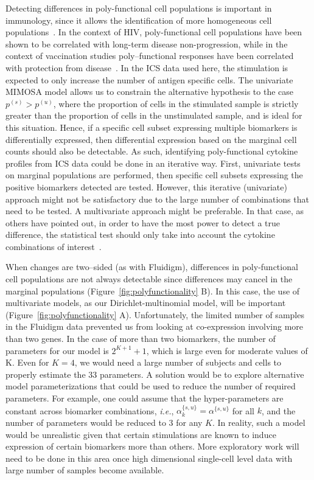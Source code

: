 \documentclass[12pt,oupdraft]{biostatistics}
\begin{document}
Detecting differences in poly-functional cell populations is important in immunology, since it allows the identification of more homogeneous cell populations~\citep{Milush:2009bz}.
In the context of HIV, poly-functional cell populations have been shown to be correlated with long-term disease non-progression, while in the context of vaccination studies poly--functional responses have been correlated with protection from disease~\citep{Betts:2006dw,Darrah:2007ih,Precopio:2007ht}.
In the ICS data used here, the stimulation is expected to only increase the number of antigen specific cells. The univariate MIMOSA model allows us to constrain the alternative hypothesis to the case $p^{(s)} > p^{(u)}$, where the proportion of cells in the stimulated sample is strictly greater than the proportion of cells in the unstimulated sample, and is ideal for this situation.
Hence, if a specific cell subset expressing multiple biomarkers is differentially expressed, then differential expression based on the marginal cell counts should also be detectable.
As such, identifying poly-functional cytokine profiles from ICS data could be done in an iterative way.
First, univariate tests on marginal populations are performed, then specific cell subsets expressing the positive biomarkers detected are tested.
However, this iterative (univariate) approach might not be satisfactory due to the large number of combinations that need to be tested. A multivariate approach might be preferable.
In that case,  as others have pointed out, in order to have the most power to detect a true difference, the statistical test should only take into account the cytokine combinations of interest~\citep{Nason:2006dx}.

When changes are two--sided (as with Fluidigm), differences in poly-functional cell populations are not always detectable  since differences may cancel in the marginal populations (Figure~\ref{fig:polyfunctionality} B).
In this case, the use of multivariate models, as our Dirichlet-multinomial model, will be important (Figure~\ref{fig:polyfunctionality} A).
Unfortunately, the limited number of samples in the Fluidigm data prevented us from looking at co-expression involving more than two genes.
In the case of more than two biomarkers, the number of parameters for our model is $2^{K+1}+1$, which is large even for moderate values of K. Even for  $K=4$, we would need a large number of subjects and cells to properly estimate the 33 parameters. A solution would be to explore alternative model parameterizations that could be used to reduce the number of required parameters.
For example, one could assume that the hyper-parameters are constant across biomarker combinations, \textit{i.e.}, $\alpha^{\{s,u\}}_{k}=\alpha^{\{s,u\}}$ for all $k$, and the number of parameters would be reduced to $3$ for any $K$.
In reality, such a model would be unrealistic given that certain stimulations are known to induce expression of certain biomarkers more than others.
More exploratory work will need to be done in this area once high dimensional single-cell level data with large number of samples become available.
\end{document}
